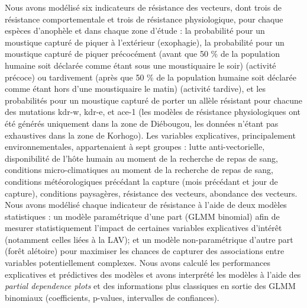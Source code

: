 \documentclass[12pt,twoside]{reedthesis}
\begin{document}
Nous avons modélisé six indicateurs de résistance des vecteurs, dont trois de résistance comportementale et trois de résistance physiologique, pour chaque espèces d'anophèle et dans chaque zone d'étude : la probabilité pour un moustique capturé de piquer à l'extérieur (exophagie), la probabilité pour un moustique capturé de piquer précocément (avant que 50 \% de la population humaine soit déclarée comme étant sous une moustiquaire le soir) (activité précoce) ou tardivement (après que 50 \% de la population humaine soit déclarée comme étant hors d'une moustiquaire le matin) (activité tardive), et les probabilités pour un moustique capturé de porter un allèle résistant pour chacune des mutations kdr-w, kdr-e, et ace-1 (les modèles de résistance physiologiques ont été générés uniquement dans la zone de Diébougou, les données n'étant pas exhaustives dans la zone de Korhogo). Les variables explicatives, principalement environnementales, appartenaient à sept groupes : lutte anti-vectorielle, disponibilité de l'hôte humain au moment de la recherche de repas de sang, conditions micro-climatiques au moment de la recherche de repas de sang, conditions météorologiques précédant la capture (mois précédant et jour de capture), conditions paysagères, résistance des vecteurs, abondance des vecteurs. Nous avons modélisé chaque indicateur de résistance à l'aide de deux modèles statistiques : un modèle paramétrique d'une part (GLMM binomial) afin de mesurer statistiquement l'impact de certaines variables explicatives d'intérêt (notamment celles liées à la LAV); et un modèle non-paramétrique d'autre part (forêt alétoire) pour maximiser les chances de capturer des associations entre variables potentiellement complexes. Nous avons calculé les performances explicatives et prédictives des modèles et avons interprété les modèles à l'aide des \emph{partial dependence plots} et des informations plus classiques en sortie des GLMM binomiaux (coefficients, p-values, intervalles de confiances).\\
\end{document}

